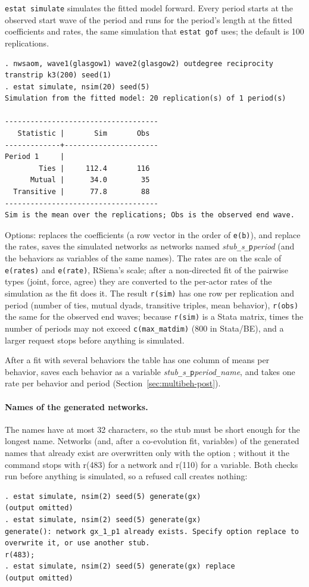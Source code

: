 \texttt{estat simulate} simulates the fitted model forward. Every period starts at the observed start wave of the period and runs for the period's length at the fitted coefficients and rates, the same simulation that \texttt{estat gof} uses; the default is 100 replications.
\begin{lstlisting}
. nwsaom, wave1(glasgow1) wave2(glasgow2) outdegree reciprocity transtrip k3(200) seed(1)
. estat simulate, nsim(20) seed(5)
Simulation from the fitted model: 20 replication(s) of 1 period(s)

------------------------------------
   Statistic |       Sim       Obs
-------------+----------------------
Period 1     |
        Ties |     112.4       116
      Mutual |      34.0        35
  Transitive |      77.8        88
------------------------------------
Sim is the mean over the replications; Obs is the observed end wave.
\end{lstlisting}
Options:  replaces the coefficients (a row vector in the order of \texttt{e(b)}),  and  replace the rates,  saves the simulated networks as networks named \emph{stub}\texttt{\_}\emph{s}\texttt{\_p}\emph{period} (and the behaviors as variables of the same names). The rates are on the scale of \texttt{e(rates)} and \texttt{e(rate)}, RSiena's scale; after a non-directed fit of the pairwise types (joint, force, agree) they are converted to the per-actor rates of the simulation as the fit does it. The result \texttt{r(sim)} has one row per replication and period (number of ties, mutual dyads, transitive triples, mean behavior), \texttt{r(obs)} the same for the observed end waves; because \texttt{r(sim)} is a Stata matrix,  times the number of periods may not exceed \texttt{c(max\_matdim)} (800 in Stata/BE), and a larger request stops before anything is simulated.

After a fit with several behaviors the table has one column of means per behavior,  saves each behavior as a variable \emph{stub}\texttt{\_}\emph{s}\texttt{\_p}\emph{period}\texttt{\_}\emph{name}, and  takes one rate per behavior and period (Section~\ref{sec:multibeh-post}).

\paragraph{Names of the generated networks.} The names have at most 32 characters, so the stub must be short enough for the longest name. Networks (and, after a co-evolution fit, variables) of the generated names that already exist are overwritten only with the option ; without it the command stops with r(483) for a network and r(110) for a variable. Both checks run before anything is simulated, so a refused call creates nothing:
\begin{lstlisting}
. estat simulate, nsim(2) seed(5) generate(gx)
(output omitted)
. estat simulate, nsim(2) seed(5) generate(gx)
generate(): network gx_1_p1 already exists. Specify option replace to
overwrite it, or use another stub.
r(483);
. estat simulate, nsim(2) seed(5) generate(gx) replace
(output omitted)
\end{lstlisting}

